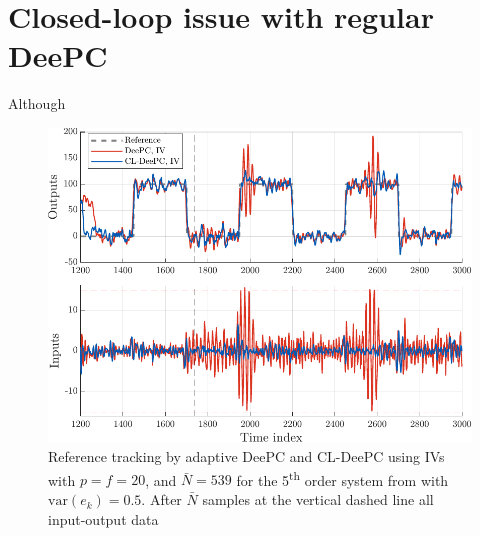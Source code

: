 \section{Closed-loop issue with regular \ac{DeePC}}\label{sec:CL_ID_issue}
Although 

\begin{figure}
\begin{center}
\includegraphics[width=\columnwidth]{results/figures/fig_prob_sol.pdf}    %
\caption{Reference tracking by adaptive \ac{DeePC} and \ac{CL-DeePC} using \ac{IVs} with $p=f=20$, and $\bar{N}=539$ for the 5\textsuperscript{th} order system from \cite{Favoreel1999} with $\text{var}(e_k)=0.5$. After $\bar{N}$ samples at the vertical dashed line all input-output data }  %
\label{fig:CL_Problem_Solution}                                 %
\end{center}                                 %
\end{figure}